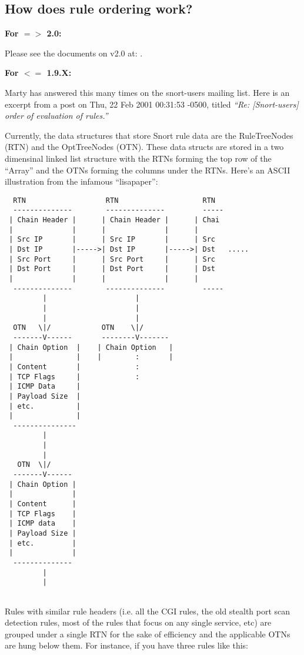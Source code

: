 \documentclass{article}
\begin{document}
\subsection{How does rule ordering work?}

{\bf For $=>$ 2.0:}

Please see the documents on v2.0 at:
.

{\bf For $<=$ 1.9.X:}

Marty has answered this many times on the snort-users mailing list.  Here is
an excerpt from a post on Thu, 22 Feb 2001 00:31:53 -0500, titled {\em ``Re: 
[Snort-users] order of evaluation of rules.''}

Currently, the data structures that store Snort rule data are the
RuleTreeNodes (RTN) and the OptTreeNodes (OTN).  These data structs are
stored in a two dimensinal linked list structure with the RTNs forming
the top row of the ``Array'' and the OTNs forming the columns under the
RTNs.  Here's an ASCII illustration from the infamous ``lisapaper'':

\begin{verbatim}
  RTN                   RTN                    RTN           
  --------------        --------------         -----
 | Chain Header |      | Chain Header |      | Chai
 |              |      |              |      |
 | Src IP       |      | Src IP       |      | Src
 | Dst IP       |----->| Dst IP       |----->| Dst   .....
 | Src Port     |      | Src Port     |      | Src
 | Dst Port     |      | Dst Port     |      | Dst
 |              |      |              |      |
  --------------        --------------         -----
         |                     |
         |                     |
         |                     |
  OTN   \|/            OTN    \|/
  -------V------       --------V-------
 | Chain Option  |    | Chain Option   |
 |               |    |        :       |
 | Content       |             :
 | TCP Flags     |             :
 | ICMP Data     |
 | Payload Size  |
 | etc.          |
 |               |
  --------------- 
         |
         |
         |
   OTN  \|/
  -------V------
 | Chain Option |
 |              |
 | Content      |
 | TCP Flags    |
 | ICMP data    |
 | Payload Size |
 | etc.         |
 |              |
  -------------- 
         |
         |
 
\end{verbatim}

Rules with similar rule headers (i.e. all the CGI rules, the old stealth
port scan detection rules, most of the rules that focus on any single
service, etc) are grouped under a single RTN for the sake of efficiency
and the applicable OTNs are hung below them.  For instance, if you have
three rules like this:
\end{document}
